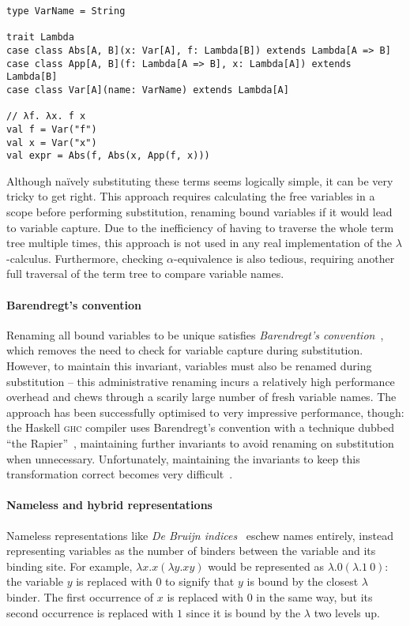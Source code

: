 \documentclass[../../../main.tex]{subfiles}
\begin{document}
\begin{verbatim}
type VarName = String

trait Lambda
case class Abs[A, B](x: Var[A], f: Lambda[B]) extends Lambda[A => B]
case class App[A, B](f: Lambda[A => B], x: Lambda[A]) extends Lambda[B]
case class Var[A](name: VarName) extends Lambda[A]

// λf. λx. f x
val f = Var("f")
val x = Var("x")
val expr = Abs(f, Abs(x, App(f, x)))
\end{verbatim}
%
Although naïvely substituting these terms seems logically simple, it can be very tricky to get right.
This approach requires calculating the free variables in a scope before performing substitution, renaming bound variables if it would lead to variable capture.
Due to the inefficiency of having to traverse the whole term tree multiple times, this approach is not used in any real implementation of the $\lambda$-calculus.
Furthermore, checking $\alpha$-equivalence is also tedious, requiring another full traversal of the term tree to compare variable names.

\paragraph{Barendregt's convention}
Renaming all bound variables to be unique satisfies \emph{Barendregt's convention}~\cite{barendregt_lambda_1984}, which removes the need to check for variable capture during substitution.
However, to maintain this invariant, variables must also be renamed during substitution -- this administrative renaming incurs a relatively high performance overhead and chews through a scarily large number of fresh variable names.
The approach has been successfully optimised to very impressive performance, though:
the Haskell \textsc{ghc} compiler uses Barendregt's convention with a technique dubbed ``the Rapier''~\cite{peytonjones_secrets_2002}, maintaining further invariants to avoid renaming on substitution when unnecessary.
Unfortunately, maintaining the invariants to keep this transformation correct becomes very difficult~\cite{maclaurin_thefoil_2023}.

\paragraph{Nameless and hybrid representations}
Nameless representations like \emph{De Bruijn indices}~\cite{debruijn_lambda_1972} eschew names entirely, instead representing variables as the number of binders between the variable and its binding site.
For example, $\lambda x. x(\lambda y. x y)$ would be represented as $\lambda. 0(\lambda. 1\ 0)$: the variable $y$ is replaced with $0$ to signify that $y$ is bound by the closest $\lambda$ binder.
The first occurrence of $x$ is replaced with $0$ in the same way, but its second occurrence is replaced with $1$ since it is bound by the $\lambda$ two levels up.
\end{document}
